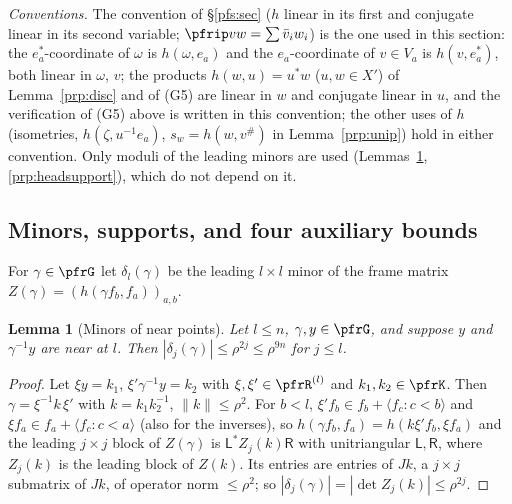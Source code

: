 \documentclass[10pt]{amsart}
\newtheorem{lemma}[theorem]{Lemma}
\theoremstyle{definition}
\theoremstyle{remark}
\begin{document}
\emph{Conventions.} The convention of \S\ref{pfs:sec} ($h$ linear in its first and conjugate linear in its second
variable; $\pfrip vw=\sum\bar v_iw_i$) is the one used in this section: the $e_a^*$-coordinate of $\omega$ is
$h(\omega,e_a)$ and the $e_a$-coordinate of $v\in V_a$ is $h(v,e_a^*)$, both linear in $\omega$, $v$; the products
$h(w,u)=u^*w$ ($u,w\in X'$) of Lemma~\ref{prp:disc} and of (G5) are linear in $w$ and conjugate linear in $u$, and the
verification of (G5) above is written in this convention; the other uses of $h$ (isometries,
$h(\zeta,u^{-1}e_a)$, $s_w=h(w,v^\#)$ in Lemma~\ref{prp:unip}) hold in either convention. Only moduli of the
leading minors are used (Lemmas~\ref{prp:minor}, \ref{prp:headsupport}), which do not depend on it.

\subsection{Minors, supports, and four auxiliary bounds}\label{prp:ss-aux}

For $\gamma\in\pfrG$ let $\delta_l(\gamma)$ be the leading $l\times l$ minor of the frame matrix
$Z(\gamma)=(h(\gamma f_b,f_a))_{a,b}$.

\begin{lemma}[Minors of near points]\label{prp:minor}
Let $l\le n$, $\gamma,y\in\pfrG$, and suppose $y$ and $\gamma^{-1}y$ are near at $l$. Then
$|\delta_j(\gamma)|\le\rho^{2j}\le\rho^{9n}$ for $j\le l$.
\end{lemma}
\begin{proof}
Let $\xi y=k_1$, $\xi'\gamma^{-1}y=k_2$ with $\xi,\xi'\in\pfrR^{(l)}$ and $k_1,k_2\in\pfrK$. Then
$\gamma=\xi^{-1}k\,\xi'$ with $k=k_1k_2^{-1}$, $\|k\|\le\rho^2$. For $b<l$, $\xi'f_b\in f_b+\langle f_c:c<b\rangle$
and $\xi f_a\in f_a+\langle f_c:c<a\rangle$ (also for the inverses), so
$h(\gamma f_b,f_a)=h(k\xi'f_b,\xi f_a)$ and the leading $j\times j$ block of $Z(\gamma)$ is $\mathsf L^*Z_j(k)\mathsf R$
with unitriangular $\mathsf L,\mathsf R$, where $Z_j(k)$ is the leading block of $Z(k)$. Its entries are
entries of $Jk$, a $j\times j$ submatrix of $Jk$, of operator norm $\le\rho^2$; so
$|\delta_j(\gamma)|=|\det Z_j(k)|\le\rho^{2j}$.
\end{proof}
\end{document}

